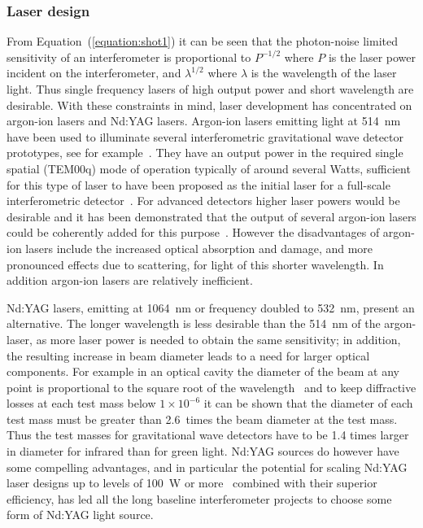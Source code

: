 \documentclass{article}
\begin{document}

\subsubsection{Laser design}
\label{subsubsection:laserdesign}

From Equation~(\ref{equation:shot1}) it can be seen that the
photon-noise limited sensitivity of an interferometer is proportional
to $P^{-1/2}$ where $P$ is the laser power incident on the
interferometer, and $\lambda^{1/2}$ where $\lambda$ is the wavelength
of the laser light. Thus single frequency lasers of high output power
and short wavelength are desirable. With these constraints in mind,
laser development has concentrated on argon-ion lasers and Nd:YAG
lasers.  Argon-ion lasers emitting light at 514~nm have been used to
illuminate several interferometric gravitational wave detector
prototypes, see for example~\cite{Shoemaker, Robertson}. They have an
output power in the required single spatial (TEM00q) mode of operation
typically of around several Watts, sufficient for this type of laser
to have been proposed as the initial laser for a full-scale
interferometric detector~\cite{Vogt}. For advanced detectors higher
laser powers would be desirable and it has been demonstrated that the
output of several argon-ion lasers could be coherently added for this
purpose~\cite{Kerr}. However the disadvantages of argon-ion lasers
include the increased optical absorption and damage, and more
pronounced effects due to scattering, for light of this shorter
wavelength. In addition argon-ion lasers are relatively inefficient.
        
Nd:YAG lasers, emitting at 1064~nm or frequency doubled to 532~nm,
present an alternative. The longer wavelength is less desirable than
the 514~nm of the argon-laser, as more laser power is needed to obtain
the same sensitivity; in addition, the resulting increase in beam
diameter leads to a need for larger optical components. For example in
an optical cavity the diameter of the beam at any point is
proportional to the square root of the wavelength~\cite{Kogelnik} and
to keep diffractive losses at each test mass below $1 \times 10^{-6}$
it can be shown that the diameter of each test mass must be greater
than 2.6~times the beam diameter at the test mass. Thus the test
masses for gravitational wave detectors have to be 1.4 times larger in
diameter for infrared than for green light. Nd:YAG sources do however
have some compelling advantages, and in particular the potential for
scaling Nd:YAG laser designs up to levels of 100~W or
more~\cite{Shine} combined with their superior efficiency, has led all
the long baseline interferometer projects to choose some form of
Nd:YAG light source.
      
\end{document}
